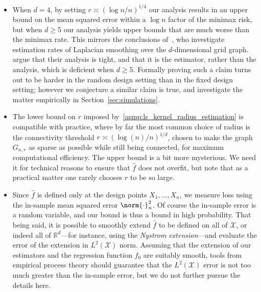 \documentclass[twoside]{article}
\newcommand{\Reals}{\mathbb{R}}
\newcommand{\1}{\mathbf{1}}
\newcommand{\Xset}{\mathcal{X}}
\newcommand{\Leb}{L}
\newcommand{\wh}[1]{\widehat{#1}}
\theoremstyle{definition}
\theoremstyle{remark}
\begin{document}
\begin{itemize}
	\item When $d = 4$, by setting $r \asymp (\log n/n)^{1/4}$ our analysis results in an upper bound on the mean squared error within a $\log n$ factor of the minimax risk, but when $d \geq 5$ our analysis yields upper bounds that are much worse than the minimax rate. This mirrors the conclusions of~\cite{sadhanala16}, who investigate estimation rates of Laplacian smoothing over the $d$-dimensional grid graph. \cite{sadhanala16} argue that their analysis is tight, and that it is the estimator, rather than the analysis, which is deficient when $d \geq 5$. Formally proving such a claim turns out to be harder in the random design setting than in the fixed design setting; however we conjecture a similar claim is true, and investigate the matter empirically in Section~\ref{sec:simulations}.
	\item The lower bound on $r$ imposed by~\ref{asmp:ls_kernel_radius_estimation} is  compatible with practice, where by far the most common choice of radius is the connectivity threshold $r \asymp (\log(n)/n)^{1/d}$, chosen to make the graph $G_{n,r}$ as sparse as possible while still being connected, for maximum computational efficiency. The upper bound is a bit more mysterious. We need it for technical reasons to ensure that $\wh{f}$ does not overfit, but note that as a practical matter one rarely chooses $r$ to be so large.
	\item Since $\wh{f}$ is defined only at the design points $X_1,\ldots,X_n$, we measure loss using the in-sample mean squared error $\norm{\cdot}_n^2$. Of course the in-sample error is a random variable, and our bound is thus a bound in high probability. That being said, it is possible to smoothly extend $\wh{f}$ to be defined on all of $\Xset$, or indeed all of $\Reals^d$---for instance, using the \emph{Nystrom extension}---and evaluate the error of the extension in $\Leb^2(\Xset)$ norm. Assuming that the extension of our estimators and the regression function $f_0$ are suitably smooth, tools from empirical process theory should guarantee that the $\Leb^2(\Xset)$ error is not too much greater than the in-sample error, but we do not further pursue the details here.
\end{itemize}
\end{document}
